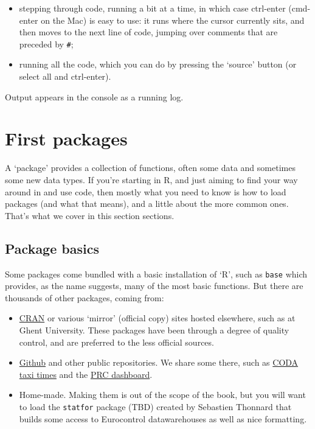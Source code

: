 \documentclass[
]{book}
\providecommand{\tightlist}{%
  \setlength{\itemsep}{0pt}\setlength{\parskip}{0pt}}
\begin{document}
\begin{itemize}
\tightlist
\item
  stepping through code, running a bit at a time, in which case ctrl-enter (cmd-enter on the Mac) is easy to use: it runs where the cursor currently sits, and then moves to the next line of code, jumping over comments that are preceded by \texttt{\#};
\item
  running all the code, which you can do by pressing the `source' button (or select all and ctrl-enter).
\end{itemize}

Output appears in the console as a running log.

\hypertarget{packages}{%
\section{First packages}\label{packages}}

A `package' provides a collection of functions, often some data and sometimes some new data types. If you're starting in R, and just aiming to find your way around in and use code, then mostly what you need to know is how to load packages (and what that means), and a little about the more common ones. That's what we cover in this section sections.

\hypertarget{package-basics}{%
\subsection{Package basics}\label{package-basics}}

Some packages come bundled with a basic installation of `R', such as \texttt{base} which provides, as the name suggests, many of the most basic functions. But there are thousands of other packages, coming from:

\begin{itemize}
\tightlist
\item
  \href{https://cran.r-project.org}{CRAN} or various `mirror' (official copy) sites hosted elsewhere, such as at Ghent University. These packages have been through a degree of quality control, and are preferred to the less official sources.
\item
  \href{https://github.com}{Github} and other public repositories. We share some there, such as \href{https://github.com/david6marsh/codaTaxi}{CODA taxi times} and the \href{https://github.com/euctrl-pru/portal}{PRC dashboard}.
\item
  Home-made. Making them is out of the scope of the book, but you will want to load the \texttt{statfor} package (TBD) created by Sebastien Thonnard that builds some access to Eurocontrol datawarehouses as well as nice formatting.
\end{itemize}
\end{document}
